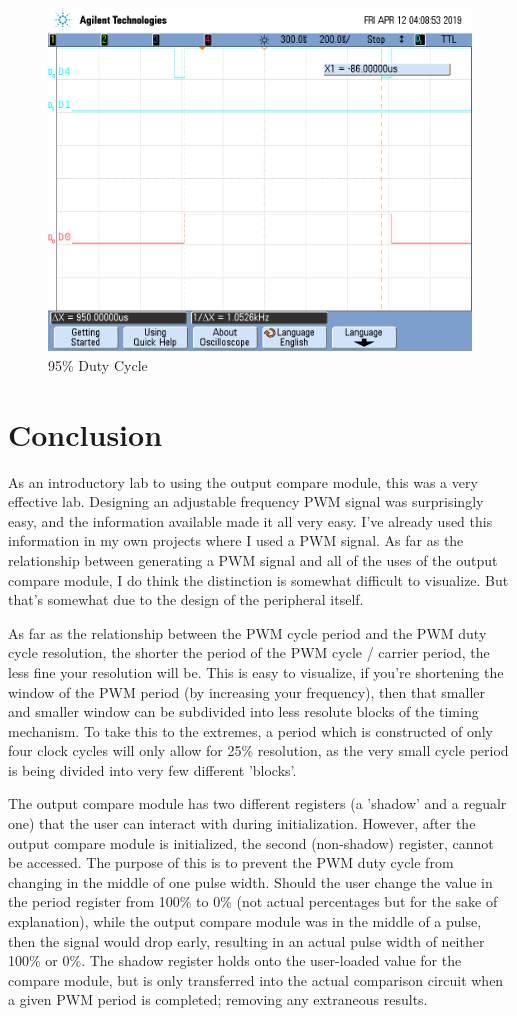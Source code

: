 \documentclass[a4paper, 12pt]{article}
\begin{document}
\begin{figure}[H]
\centering
\includegraphics[width=.8\textwidth]{scope_11.png}
\caption{95\% Duty Cycle}
\label{fig:scope11}
\end{figure}
 
\section{Conclusion}
As an introductory lab to using the output compare module, this was a very effective lab. Designing an adjustable frequency PWM signal was surprisingly easy, and the information available made it all very easy. I've already used this information in my own projects where I used a PWM signal. As far as the relationship between generating a PWM signal and all of the uses of the output compare module, I do think the distinction is somewhat difficult to visualize. But that's somewhat due to the design of the peripheral itself.

As far as the relationship between the PWM cycle period and the PWM duty cycle resolution, the shorter the period of the PWM cycle / carrier period, the less fine your resolution will be. This is easy to visualize, if you're shortening the window of the PWM period (by increasing your frequency), then that smaller and smaller window can be subdivided into less resolute blocks of the timing mechanism. To take this to the extremes, a period which is constructed of only four clock cycles will only allow for 25\% resolution, as the very small cycle period is being divided into very few different 'blocks'. 

The output compare module has two different registers (a 'shadow' and a regualr one) that the user can interact with during initialization. However, after the output compare module is initialized, the second (non-shadow) register, cannot be accessed. The purpose of this is to prevent the PWM duty cycle from changing in the middle of one pulse width. Should the user change the value in the period register from 100\% to 0\% (not actual percentages but for the sake of explanation), while the output compare module was in the middle of a pulse, then the signal would drop early, resulting in an actual pulse width of neither 100\% or 0\%. The shadow register holds onto the user-loaded value for the compare module, but is only transferred into the actual comparison circuit when a given PWM period is completed; removing any extraneous results.
\end{document}
